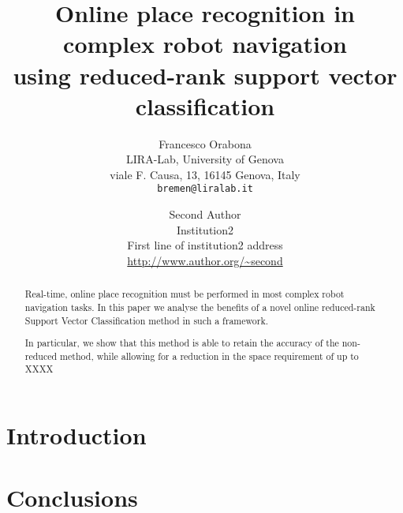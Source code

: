 \documentclass[10pt,twocolumn,letterpaper]{article}
\begin{document}

\title{Online place recognition in complex robot navigation \\
using reduced-rank support vector classification}

\author{Francesco Orabona\\
LIRA-Lab, University of Genova\\
viale F. Causa, 13, 16145 Genova, Italy\\
{\tt\small bremen@liralab.it}
\and
Second Author\\
Institution2\\
First line of institution2 address\\
{\small\url{http://www.author.org/~second}}
}

\maketitle


\begin{abstract}
  Real-time, online place recognition must be performed in most
  complex robot navigation tasks. In this paper we analyse the
  benefits of a novel online reduced-rank Support Vector
  Classification method in such a framework.

  In particular, we show that this method is able to retain the
  accuracy of the non-reduced method, while allowing for a reduction
  in the space requirement of up to XXXX%
\end{abstract}


\section{Introduction}


\section{Conclusions}


{\small


}
\end{document}
